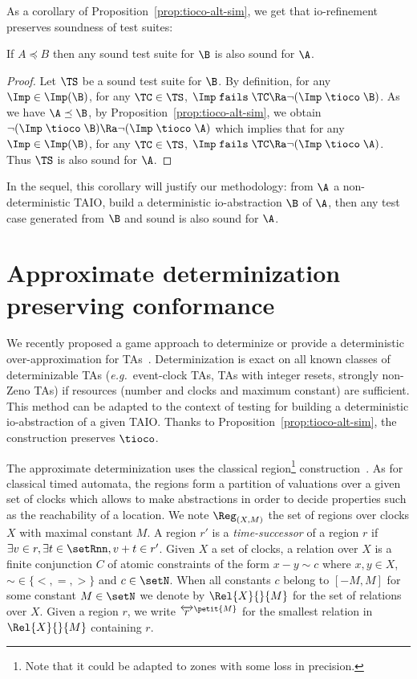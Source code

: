 \documentclass{LMCS}
\theoremstyle{plain}\newtheorem{proposition}[thm]{Proposition}
\def\eg{{\em e.g.}}
\begin{document}
As a corollary of Proposition~\ref{prop:tioco-alt-sim}, we get that
io-refinement preserves soundness of test suites:
\begin{cor}
\label{cor}
If $A \preceq B$ 
then any sound test suite for $\B$ is also sound for $\A$.
\end{cor}
\begin{proof}
Let $\TS$ be a  sound test suite for $\B$.
By definition, for any $\Imp \in \Imp(\B)$, for any $\TC \in \TS$, $\Imp \; {\tt fails} \; \TC \Ra \neg (\Imp \; \tioco \;\B)$.
As we have $\A \preceq \B$, by Proposition~\ref{prop:tioco-alt-sim}, 
we obtain $\neg (\Imp \; \tioco \;\B) \Ra \neg (\Imp \; \tioco \;\A)$
which implies 
that for any $\Imp \in \Imp(\B)$, for any $\TC \in \TS$, $\Imp \; {\tt fails} \; \TC \Ra \neg (\Imp \; \tioco \;\A)$.
Thus $\TS$ is also sound for $\A$.
\end{proof}
In the sequel, this corollary will justify 
our methodology:
from $\A$ a non-deterministic TAIO, 
build a deterministic io-abstraction $\B$ of $\A$,
then any test case generated from $\B$ and sound
is also sound for $\A$.
 

\section{Approximate determinization preserving conformance}
\label{sec-determinisation}

We recently proposed a game approach to determinize or provide a
deterministic over-approximation for TAs~\cite{BertrandStainerJeronKrichen-FOSSACS2011}.
Determinization is exact on all known classes of determinizable TAs
(\eg  ~event-clock TAs, TAs with integer resets, strongly non-Zeno TAs) if
resources (number and clocks and maximum constant) are sufficient.  
This
method can be adapted to the context of testing for building a
deterministic io-abstraction of a given TAIO. Thanks to
Proposition~\ref{prop:tioco-alt-sim}, the construction preserves
$\tioco$.



The approximate determinization uses the classical region\footnote{Note that it could be adapted to zones with some loss in precision.}
construction~\cite{AlurDill94}.  As for classical timed automata, the
regions form a partition of valuations over a given set of clocks
which allows to make abstractions in order to decide properties such as
the reachability of a
location.  We note $\Reg_{(X,M)}$ the set of regions over clocks $X$ with maximal
constant $M$.  A region $r'$ is a {\em time-successor} of a region $r$
if $\exists v \in r, \exists t \in \setRnn, v+t \in r'$.  Given
  $X$ a set of clocks, a relation over $X$ is a finite conjunction $C$
  of atomic constraints of the form $x-y \sim c$ where $x, y \in X$,
  $\sim \in \{<,=,>\}$ and $c\in \setN$. When all constants $c$ belong
  to $[-M,M]$ for some constant $M \in \setN$ we denote by
  $\Rel{X}{}{M}$ for the set of relations over $X$.
Given a region $r$, we write $\overleftrightarrow{r}^{\petit{M}}$ for the smallest
relation in $\Rel{X}{}{M}$ containing $r$. 
\end{document}
